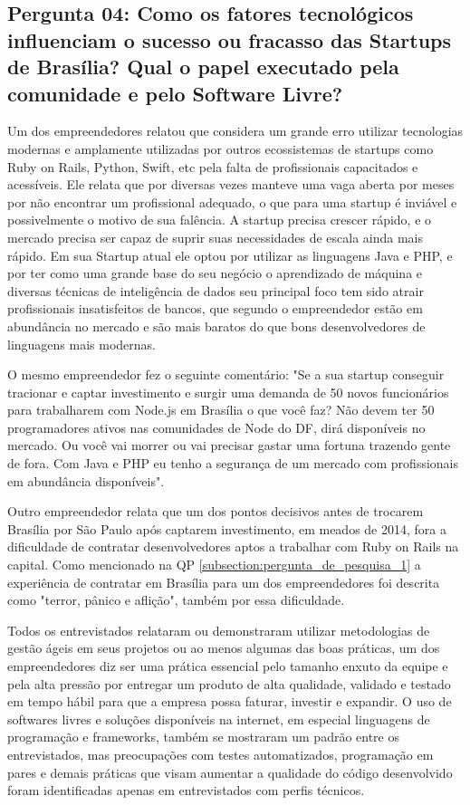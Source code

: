 \subsection*{Pergunta 04: Como os fatores tecnológicos influenciam o sucesso ou fracasso das Startups de Brasília? Qual o papel executado pela comunidade e pelo Software Livre?}
\label{subsection:pergunta_de_pesquisa_4}

Um dos empreendedores relatou que considera um grande erro utilizar tecnologias modernas e amplamente utilizadas por outros ecossistemas de startups como Ruby on Rails, Python, Swift, etc pela falta de profissionais capacitados e acessíveis. Ele relata que por diversas vezes manteve uma vaga aberta por meses por não encontrar um profissional adequado, o que para uma startup é inviável e possivelmente o motivo de sua falência. A startup precisa crescer rápido, e o mercado precisa ser capaz de suprir suas necessidades de escala ainda mais rápido. Em sua Startup atual ele optou por utilizar as linguagens Java e PHP, e por ter como uma grande base do seu negócio o aprendizado de máquina e diversas técnicas de inteligência de dados seu principal foco tem sido atrair profissionais insatisfeitos de bancos, que segundo o empreendedor estão em abundância no mercado e são mais baratos do que bons desenvolvedores de linguagens mais modernas. 

O mesmo empreendedor fez o seguinte comentário: "Se a sua startup conseguir tracionar e captar investimento e surgir uma demanda de 50 novos funcionários para trabalharem com Node.js em Brasília o que você faz? Não devem ter 50 programadores ativos nas comunidades de Node do DF, dirá disponíveis no mercado. Ou você vai morrer ou vai precisar gastar uma fortuna trazendo gente de fora. Com Java e PHP eu tenho a segurança de um mercado com profissionais em abundância disponíveis".

Outro empreendedor relata que um dos pontos decisivos antes de trocarem Brasília por São Paulo após captarem investimento, em meados de 2014, fora a dificuldade de contratar desenvolvedores aptos a trabalhar com Ruby on Rails na capital. Como mencionado na QP \ref{subsection:pergunta_de_pesquisa_1} a experiência de contratar em Brasília para um dos empreendedores foi descrita como "terror, pânico e aflição", também por essa dificuldade.

Todos os entrevistados relataram ou demonstraram utilizar metodologias de gestão ágeis em seus projetos ou ao menos algumas das boas práticas, um dos empreendedores diz ser uma prática essencial pelo tamanho enxuto da equipe e pela alta pressão por entregar um produto de alta qualidade, validado e testado em tempo hábil para que a empresa possa faturar, investir e expandir. O uso de softwares livres e soluções disponíveis na internet, em especial linguagens de programação e frameworks, também se mostraram um padrão entre os entrevistados, mas preocupações com testes automatizados, programação em pares e demais práticas que visam aumentar a qualidade do código desenvolvido foram identificadas apenas em entrevistados com perfis técnicos.

